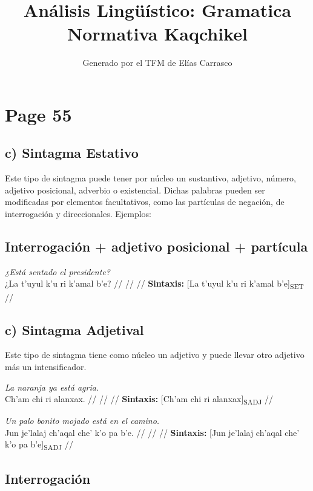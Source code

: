 \documentclass{article}%
\title{Análisis Lingüístico: Gramatica Normativa Kaqchikel}%
\author{Generado por el TFM de Elías Carrasco}%
\begin{document}
%
\normalsize%
\maketitle%
\section{Page 55}%
\label{sec:Page55}%
\subsection{c) Sintagma Estativo}%
\label{subsec:c)SintagmaEstativo}%

%
Este tipo de sintagma puede tener por núcleo un sustantivo, adjetivo, número, adjetivo %
posicional, adverbio o existencial. Dichas palabras pueden ser modificadas por %
elementos facultativos, como las partículas de negación, de interrogación y direccionales. %
Ejemplos: %
\subsection{Interrogación + adjetivo posicional + partícula}%
\label{subsec:Interrogacin+adjetivoposicional+partcula}%

%
\par\medskip%
\ex
\textit{¿Está sentado el presidente?} \\
\begingl
\gla ¿La t’uyul k’u ri k’amal b’e? //
\glb  //
\glc  //
\glft \textbf{Sintaxis:} [La t’uyul k’u ri k’amal b’e]\textsubscript{SET} //
\endgl
\xe
%
\medskip%
\subsection{c) Sintagma Adjetival}%
\label{subsec:c)SintagmaAdjetival}%

%
Este tipo de sintagma tiene como núcleo un adjetivo y puede llevar otro adjetivo más un %
intensificador. %
\par\medskip%
\ex
\textit{La naranja ya está agria.} \\
\begingl
\gla Ch’am chi ri alanxax. //
\glb  //
\glc  //
\glft \textbf{Sintaxis:} [Ch’am chi ri alanxax]\textsubscript{SADJ} //
\endgl
\xe
%
\medskip%
\par\medskip%
\ex
\textit{Un palo bonito mojado está en el camino.} \\
\begingl
\gla Jun je’lalaj ch’aqal che’ k’o pa b’e. //
\glb  //
\glc  //
\glft \textbf{Sintaxis:} [Jun je’lalaj ch’aqal che’ k’o pa b’e]\textsubscript{SADJ} //
\endgl
\xe
%
\medskip%
\subsection{Interrogación}%
\label{subsec:Interrogacin}%
\end{document}

